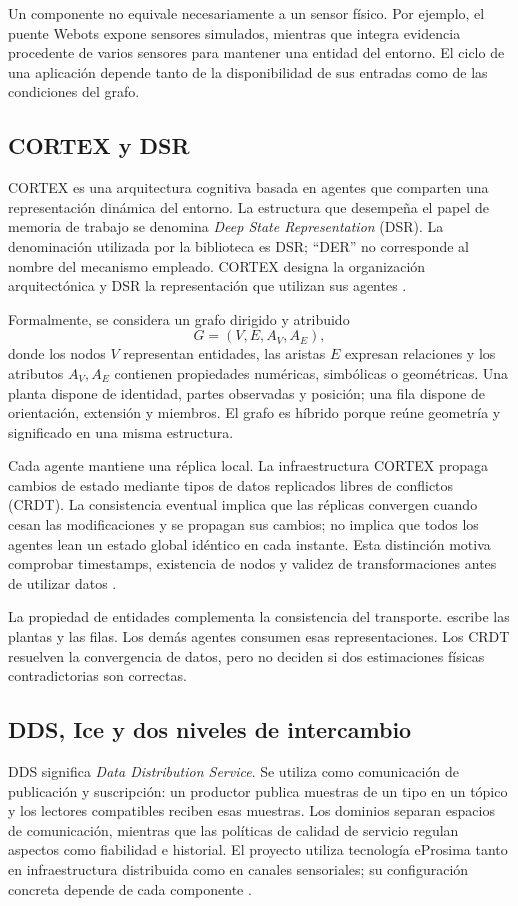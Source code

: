Un componente no equivale necesariamente a un sensor físico. Por ejemplo, el puente Webots expone sensores simulados, mientras que  integra evidencia procedente de varios sensores para mantener una entidad del entorno. El ciclo de una aplicación depende tanto de la disponibilidad de sus entradas como de las condiciones del grafo.

\subsection{CORTEX y DSR}
CORTEX es una arquitectura cognitiva basada en agentes que comparten una representación dinámica del entorno. La estructura que desempeña el papel de memoria de trabajo se denomina \emph{Deep State Representation} (DSR). La denominación utilizada por la biblioteca es DSR; ``DER'' no corresponde al nombre del mecanismo empleado. CORTEX designa la organización arquitectónica y DSR la representación que utilizan sus agentes \cite{cortex}.

Formalmente, se considera un grafo dirigido y atribuido
\begin{equation}
G=(V,E,A_V,A_E),
\end{equation}
donde los nodos $V$ representan entidades, las aristas $E$ expresan relaciones y los atributos $A_V,A_E$ contienen propiedades numéricas, simbólicas o geométricas. Una planta dispone de identidad, partes observadas y posición; una fila dispone de orientación, extensión y miembros. El grafo es híbrido porque reúne geometría y significado en una misma estructura.

Cada agente mantiene una réplica local. La infraestructura CORTEX propaga cambios de estado mediante tipos de datos replicados libres de conflictos (CRDT). La consistencia eventual implica que las réplicas convergen cuando cesan las modificaciones y se propagan sus cambios; no implica que todos los agentes lean un estado global idéntico en cada instante. Esta distinción motiva comprobar timestamps, existencia de nodos y validez de transformaciones antes de utilizar datos \cite{cortex}.

La propiedad de entidades complementa la consistencia del transporte.  escribe las plantas y  las filas. Los demás agentes consumen esas representaciones. Los CRDT resuelven la convergencia de datos, pero no deciden si dos estimaciones físicas contradictorias son correctas.

\subsection{DDS, Ice y dos niveles de intercambio}
DDS significa \emph{Data Distribution Service}. Se utiliza como comunicación de publicación y suscripción: un productor publica muestras de un tipo en un tópico y los lectores compatibles reciben esas muestras. Los dominios separan espacios de comunicación, mientras que las políticas de calidad de servicio regulan aspectos como fiabilidad e historial. El proyecto utiliza tecnología eProsima tanto en infraestructura distribuida como en canales sensoriales; su configuración concreta depende de cada componente \cite{cortex,launch}.

